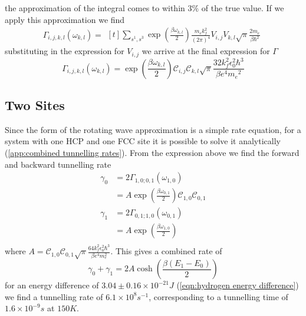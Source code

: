 the approximation
of the integral comes
to within \(3\% \)
of the true value.
If we apply this approximation
we find
\begin{equation}
    \Gamma_{i,j, k,l}(\omega_{k,l}) =\begin{aligned}[t]
        \sum_{s^1,s^3} \exp{(\frac{\beta \omega_{k,l}}{2})} \frac{m_e k_f^2 }{{(2\pi)}^4}
        V_{i,j} V_{k,l} \sqrt{\pi} \frac{2m_e}{\beta \hbar^2}
    \end{aligned}
\end{equation}
substituting in the expression
for \(V_{i,j}\)
we arrive at the final
expression for \(\Gamma \)
\begin{equation}
    \Gamma_{i,j, k,l}(\omega_{k,l})   =
    \exp{(\frac{\beta \omega_{k,l}}{2})}
    \mathcal{C}_{i,j} \mathcal{C}_{k,l}
    \sqrt{\pi} \frac{32 k_f^2 \epsilon_0^2 \hbar^3}{\beta e^4 {m_e}^2}
\end{equation}


\subsection{Two Sites}
Since the form of the rotating
wave approximation is a simple
rate equation, for a system
with one HCP and one FCC site
it is possible to solve it analytically
(\cref{app:combined tunnelling rates}).
From the expression above we find the
forward and backward tunnelling rate
\begin{align}
    \gamma_0 & = 2\Gamma_{1,0;0, 1}(\omega_{1,0})       \\
             & = A \exp{(\frac{\beta \omega_{0,1}}{2})}
    \mathcal{C}_{1,0} \mathcal{C}_{0,1}                 \\
    \gamma_1 & = 2\Gamma_{0,1;1, 0}(\omega_{0,1})       \\
             & = A \exp{(\frac{\beta \omega_{1,0}}{2})} \\
\end{align}
where
\(A =
\mathcal{C}_{1,0} \mathcal{C}_{0,1}
\sqrt{\pi}
\frac{64 k_f^2 \epsilon_0^2 \hbar^3}{\beta e^4 m_e^2}\).
This gives a combined rate of
\begin{equation}
    \gamma_0 + \gamma_1 = 2A\cosh{(\frac{\beta (E_1 - E_0)}{2})}
    \label{eqn:theoretical rate lindblad equation}
\end{equation}
for an energy difference of
\(3.04\pm0.16\times{}10^{-21} J\)
(\cref{eqn:hydrogen energy difference})
we find a tunnelling rate of
\(6.1\times{}10^{8}s^{-1}\),
corresponding to a
tunnelling time of
\(1.6\times{}10^{-9}s\) at
\(150K\).


